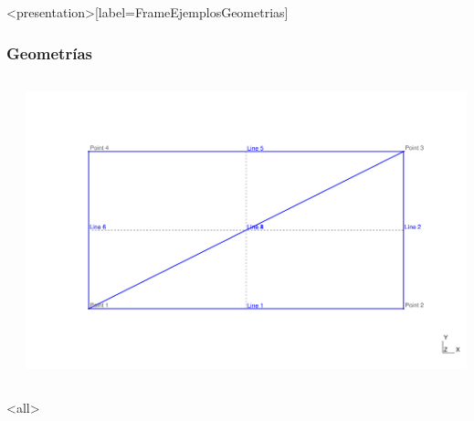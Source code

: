 \mode*
\begin{frame}<presentation>[label=FrameEjemplosGeometrias]
  \frametitle{Geometrías}

  \begin{columns}

      \begin{codeblock}
	\scriptsize{
      
    }
    \end{codeblock}
    \includegraphics[width=\textwidth]{./Ejemplos/PuenteClase.pdf}
  \end{columns}



\end{frame}

\mode<all>
